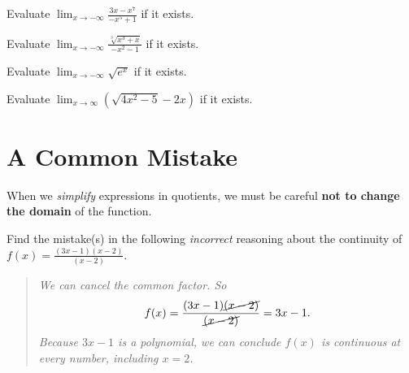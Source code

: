 \documentclass[../main.tex]{subfiles}
\begin{document}
\begin{example}
  Evaluate \(\lim_{x \to -\infty} \frac{3x - x^{7}}{- x^{5} + 1}\) if it exists.
\end{example}
\vfill
\clearpage

\begin{example}
  Evaluate \(\lim_{x \to -\infty} \frac{\sqrt[3]{x^{3} + x}}{-x^{2} - 1}\) if it exists.
\end{example}
\vspace{6in}

\begin{example}
  Evaluate \(\lim_{x \to -\infty} \sqrt{e^{x}}\) if it exists.
\end{example}
\vfill
\clearpage

\begin{example}
  Evaluate \(\lim_{x \to \infty} (\sqrt{4x^{2} - 5} - 2x)\) if it exists.
\end{example}
\clearpage


\section{A Common Mistake}
When we \emph{simplify} expressions in quotients, we must be careful \textbf{not to change the domain} of the function. 


\begin{example}
  Find the mistake(s) in the following \emph{incorrect} reasoning about the continuity of \(f(x) = \frac{(3x-1)(x-2)}{(x-2)}\).
  \bigskip

  \begin{quote}
    \itshape
    We can cancel the common factor. So
    \[
      f(x) = \frac{(3x - 1)\cancel{(x - 2)}}{\cancel{(x-2)}} = 3x - 1.
    \]
    Because \(3x - 1\) is a polynomial, we can conclude \(f(x)\) is continuous at every number, including \(x=2\).
  \end{quote}
\end{example}
\end{document}
